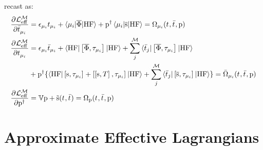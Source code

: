 recast as:
\begin{equation}
  \begin{aligned}
   \frac{\partial^{}\mathcal{L}^\mathcal{M}_\mathrm{eff}} {\partial \bar{t}_{\mu_i}^{}} &=
   \epsilon_{\mu_i}t_{\mu_i} + \braket{\mu_i | \overline{\Phi} | \mathrm{HF}}
   + \mathrm{p}^\dagger\braket{\mu_i | \overline{\mathrm{s}} | \mathrm{HF}}
    = \Omega_{\mu_i}(t_{}, \bar{t}_{}, \mathrm{p}) \\
    \frac{\partial^{}\mathcal{L}^\mathcal{M}_\mathrm{eff}} {\partial t_{\mu_i}^{}} &=
    \epsilon_{\mu_i}\bar{t}_{\mu_i} +
    \braket{\mathrm{HF} | \left[ \overline{\Phi}, \tau_{\mu_i} \right]^{} | \mathrm{HF}} +
    \sum_{j}^{\mathcal{M}}\braket{\bar{t}_{j} | \left[ \overline{\Phi}, \tau_{\mu_i} \right]^{} | \mathrm{HF}} \\
    &+ \mathrm{p}^\dagger\lbrace
    \braket{\mathrm{HF} | \left[ \mathrm{s}, \tau_{\mu_i} \right]^{} +
    \left[ \left[ \mathrm{s}, T \right]^{}, \tau_{\mu_i} \right]^{}| \mathrm{HF}} +
    \sum_{j}^{\mathcal{M}}\braket{\bar{t}_{j} | \left[ \overline{\mathrm{s}}, \tau_{\mu_i} \right]^{} | \mathrm{HF}}
             \rbrace
    = \bar{\Omega}_{\mu_i}(t_{}, \bar{t}_{}, \mathrm{p}) \\
    \frac{\partial^{}\mathcal{L}^\mathcal{M}_\mathrm{eff}} {\partial {\mathrm{p}^{\dagger}}^{}} &=
    \mathbb{V}\mathrm{p} + \tilde{\mathrm{s}}(t_{}, \bar{t}_{}) =
    \Omega_{\mathrm{p}}(t_{}, \bar{t}_{}, \mathrm{p})
  \end{aligned}
\end{equation}


\section{Approximate Effective Lagrangians}\label{sec:approximate-lagrangians}

